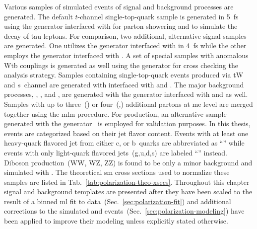 Various samples of simulated events of signal and background processes are generated. The default $t$-channel single-top-quark sample is generated in 5~\gls{fs} using the \POWHEG generator interfaced with  for parton showering and \TAUOLA to simulate the decay of tau leptons. For comparison, two additional, alternative signal samples are generated. One utilizes the \AMC generator interfaced with  in 4~\gls{fs} while the other employs the \COMPHEP generator interfaced with . A set of special samples with anomalous Wtb couplings is generated as well using the \COMPHEP generator for cross checking the analysis strategy. Samples containing single-top-quark events produced via tW and $s$~channel are generated with \POWHEG interfaced with  and \TAUOLA. The major background processes, \wjets, \zjets, and \ttbar, are generated with the \MG generator interfaced with  and \TAUOLA as well. Samples with up to three~(\ttbar) or four~(\wjets,\zjets) additional partons at \gls{me} level are merged together using the \gls{mlm} procedure. For \wjets production, an alternative sample generated with the \SHERPA[format=hyperbf] generator~\cite{Hoeche:2012ft} is employed for validation purposes. In this thesis, \wjets events are categorized based on their jet flavor content. Events with at least one heavy-quark flavored jet from either c, or b~quarks are abbreviated as ``'' while events with only light-quark flavored jets~(g,u,d,s) are labeled ``'' instead. Diboson production~(WW, WZ, ZZ) is found to be only a minor background and simulated with . The theoretical \gls{sm} cross sections used to normalize these samples are listed in Tab.~\ref{tab:polarization-theo-xsecs}. Throughout this chapter signal and background templates are presented after they have been scaled to the result of a binned \gls{ml} fit to data~(Sec.~\ref{sec:polarization-fit}) and additional corrections to the simulated \wjets and \ttbar events~(Sec.~\ref{sec:polarization-modeling}) have been applied to improve their modeling unless explicitly stated otherwise.

